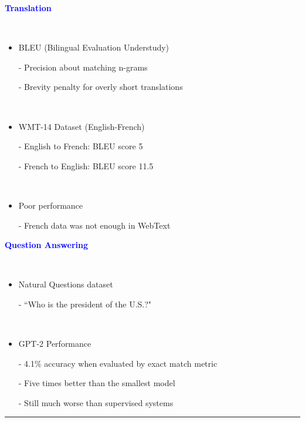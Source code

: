 \documentclass[professionalfont]{beamer}
\begin{document}
\begin{frame}

\begin{center}
    { \textbf{\textcolor{blue}{ {\fontsize{12}{14}\selectfont Translation} }} }
\end{center}
\\[0.3cm]

{\fontsize{10}{14}\selectfont 
\begin{itemize}
    \item BLEU (Bilingual Evaluation Understudy)

    - Precision about matching n-grams

    - Brevity penalty for overly short translations

    \\[0.3cm]

    \item WMT-14 Dataset (English-French)
    
    - English to French: BLEU score 5
    
    - French to English: BLEU score 11.5

    \\[0.3cm]

    \item Poor performance

    - French data was not enough in WebText

\end{itemize}
}

\end{frame}

\begin{frame}
\begin{refsection}

\begin{center}
    { \textbf{\textcolor{blue}{ {\fontsize{12}{14}\selectfont Question Answering} }} }
\end{center}
\\[0.3cm]

{\fontsize{10}{14}\selectfont 
\begin{itemize}
    \item Natural Questions dataset \cite{naturalquestions}
    
    - ``Who is the president of the U.S.?"

    \\[0.3cm]

    \item GPT-2 Performance

    - 4.1\% accuracy when evaluated by exact match metric

    - Five times better than the smallest model

    - Still much worse than supervised systems
\end{itemize}
}

\vspace{0.3cm}
\hrule
\printbibliography

\end{refsection}
\end{frame}
\end{document}

